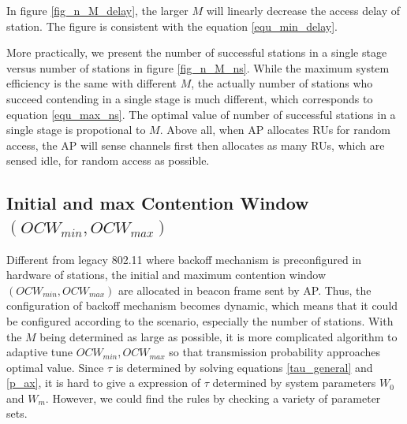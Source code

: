 In figure \ref{fig_n_M_delay}, the larger $M$ will linearly decrease the access delay of station. The figure is consistent with the equation \ref{equ_min_delay}. 

More practically, we present the number of successful stations in a single stage versus number of stations in figure \ref{fig_n_M_ns}.
While the maximum system efficiency is the same with different $M$, the actually number of stations who succeed contending in a single stage is much different, which corresponds to equation \ref{equ_max_ns}. 
The optimal value of number of successful stations in a single stage is propotional to $M$. 
Above all, when AP allocates RUs for random access, the AP will sense channels first then allocates as many RUs, which are sensed idle, for random access as possible.



\subsection{Initial and max Contention Window $(OCW_{min}, OCW_{max})$}
\label{contend_window}
Different from legacy 802.11 where backoff mechanism is preconfigured in hardware of stations, the initial and maximum contention window $(OCW_{min}, OCW_{max})$ are allocated in beacon frame sent by AP. 
Thus, the configuration of backoff mechanism becomes dynamic, which means that it could be configured according to the scenario, especially the number of stations.
With the $M$ being determined as large as possible, it is more complicated algorithm to adaptive tune $OCW_{min}, OCW_{max}$ so that transmission probability approaches optimal value.
Since $\tau$ is determined by solving equations \ref{tau_general} and \ref{p_ax}, it is hard to give a expression of $\tau$ determined by system parameters $W_0$ and $W_m$.
However, we could find the rules by checking a variety of parameter sets.

